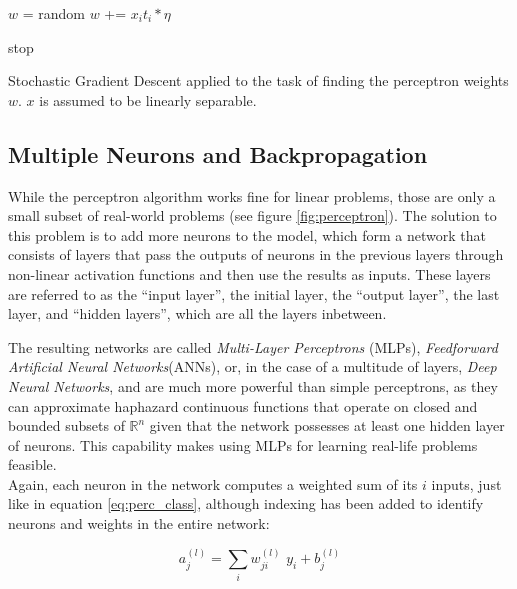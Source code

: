 \begin {algorithm}
	\begin {algorithmic}[1]
		\State $w$ = random
					\State $w$ += $x_i t_i * \eta$
				\EndIf

					\State stop
				\EndIf
			\EndFor
		\EndWhile
	\end{algorithmic}
	\caption{Stochastic Gradient Descent applied to the task of finding the perceptron weights $w$. $x$ is assumed to be linearly separable.}
	\label{alg:perceptron_algorithm}
\end{algorithm}



		\subsection{Multiple Neurons and Backpropagation}
\label{subsec:mlp_backprop}
While the perceptron algorithm works fine for linear problems, those are only a small subset of real-world problems (see figure \ref{fig:perceptron}). The solution to this problem is to add more neurons to the model, which form a network that consists of layers that pass the outputs of neurons in the previous layers through non-linear activation functions and then use the results as inputs. These layers are referred to as the ``input layer'', the initial layer, the ``output layer'', the last layer, and ``hidden layers'', which are all the layers inbetween.

The resulting networks are called \textit{Multi-Layer Perceptrons} (MLPs), \textit{Feedforward Artificial Neural Networks}(ANNs), or, in the case of a multitude of layers, \textit{Deep Neural Networks}, and are much more powerful than simple perceptrons, as they can approximate haphazard continuous functions that operate on closed and bounded subsets of $\mathbb{R}^n$ given that the network possesses at least one hidden layer of neurons. This capability makes using MLPs for learning real-life problems feasible.\cite{universal_approx}\cite{universal_approx2}\\

\noindent Again, each neuron in the network computes a weighted sum of its $i$ inputs, just like in equation \ref{eq:perc_class}, although indexing has been added to identify neurons and weights in the entire network:

\[ a_j^{(l)} = \sum \limits_{i} w^{(l)}_{ji}\,\, y_i + b^{(l)}_{j} \]

